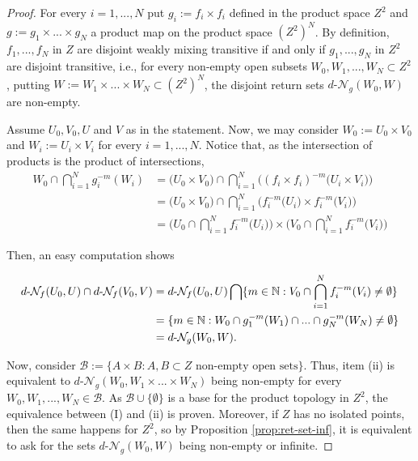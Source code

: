 \documentclass[11pt,reqno]{article}
\def\dret{d\text{-}\ret}
\def\ret{\mathcal{N}}
\def\NN{\Bbb N}
\begin{document}
\begin{proof}
 For every $i=1,...,N$ put $g_i:=f_i\times f_i$ defined in the product space $Z^2$ and  $g:=g_1\times...\times g_N$ a product map on the product space $(Z^2)^N$. By definition, $f_1,..., f_N$ in $Z$ are disjoint weakly mixing transitive if and only if $g_1,...,g_N$ in $Z^2$ are disjoint transitive, i.e., for every non-empty open subsets $W_0,W_1,...,W_N\subset Z^2$, putting $W:=W_1\times...\times W_N\subset (Z^2)^N$, the disjoint return sets $\dret_g(W_0,W)$ are non-empty.

Assume $U_0,V_0,U$ and $V$ as in the statement. Now, we may consider ${W_0:=U_0\times V_0}$ and $W_i:=U_i\times V_i$ for every $i=1,...,N$. {Notice that, as the intersection of products is the product of intersections,
\begin{equation*}
    \begin{split}
        W_0 \cap \bigcap_{i=1}^N g_i^{-m}(W_i)&= \bigg(U_0\times V_0\bigg)\cap \bigcap_{i=1}^N \bigg( (f_i\times f_i)^{-m}\big(U_i\times V_i\big)\bigg)\\
        &=\bigg( U_0\times V_0\bigg) \cap \bigcap_{i=1}^N \bigg( f_i^{-m}\big(U_i\big)\times f_i^{-m} \big( V_i\big)\bigg)\\
        &= \bigg(U_0\cap  \bigcap_{i=1}^N  f_i^{-m}\big(U_i\big)  \bigg) \times \bigg(V_0\cap  \bigcap_{i=1}^N  f_i^{-m}\big(V_i\big)  \bigg)
    \end{split}
\end{equation*}
}

Then, an easy computation shows
\small{
\begin{equation*}
\begin{split}
   \dret_f(U_0,U) \cap \dret_f(V_0,V) %
  &= \dret_f(U_0,U)\bigcap \{m\in \NN: V_0\cap \bigcap_{i=1}^N f_i^{-m}(V_i) \neq \emptyset\}\\
   &= \{m\in\NN : W_0 \cap g_1^{-m}(W_1)\cap...\cap g_N^{-m}(W_N) \neq \emptyset\}\\
    &=  \dret_g(W_0,W).
\end{split}
\end{equation*}

Now, consider $\mathcal{B}:=\{A\times B : A,B\subset Z \text{ non-empty open sets}\}$. Thus, item (ii) is equivalent to $\dret_g(W_0,W_1\times...\times W_N)$ being non-empty for every $W_0,W_1,...,W_N\in \mathcal{B}$. As $\mathcal{B} \cup \{\emptyset\}$ is a base for the product topology in $Z^2$, the equivalence between (I) and (ii) is proven. Moreover, if $Z$ has no isolated points, then the same happens for $Z^2$, so by Proposition \ref{prop:ret-set-inf}, it is equivalent to ask for the sets $\dret_g(W_0,W)$ being non-empty or infinite.
}
\end{proof}
\end{document}
